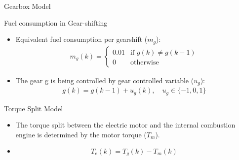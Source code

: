 \documentclass{beamer}
\begin{document}
\begin{frame}{Gearbox Model}
\begin{block}{ }
    Fuel consumption in Gear-shifting
\end{block}

\begin{itemize}
    \item   Equivalent fuel consumption per gearshift ($m_g$): \\ \begin{align*}
        m_g(k)= \begin{cases}
    0.01 & \text{if } g(k)\neq g(k-1)\\
    0              & \text{otherwise}
\end{cases}
    \end{align*}
    
    \item The gear g is being controlled by gear controlled variable ($u_g$): \\
    \begin{align*}
        g(k)= g(k-1) +u_g(k), \quad u_g \in \{-1,0,1\}
    \end{align*}
    
\end{itemize}
\end{frame}


\begin{frame}{Torque Split Model}
\begin{itemize}
    \item The torque split between the electric motor and the internal combustion engine is determined by the motor torque ($T_m$).
    
    \vspace{5pt}
    
    \item \begin{align*}
        T_e(k) = T_g(k) - T_{m}(k)
    \end{align*}
\end{itemize}
    
\end{frame}
\end{document}
